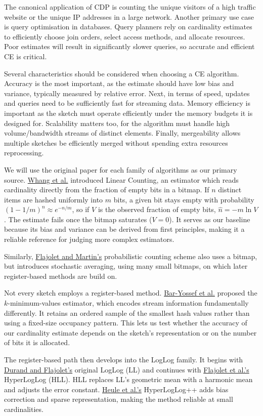 The canonical application of CDP is counting the unique visitors of a high traffic website or the unique IP addresses in a large network. Another primary use case is query optimisation in databases. Query planners rely on cardinality estimates to efficiently choose join orders, select access methods, and allocate resources. Poor estimates will result in significantly slower queries, so accurate and efficient CE is critical.

Several characteristics should be considered when choosing a CE algorithm. Accuracy is the most important, as the estimate should have low bias and variance, typically measured by relative error. Next, in terms of speed, updates and queries need to be sufficiently fast for streaming data. Memory efficiency is important as the sketch must operate efficiently under the memory budgets it is designed for. Scalability matters too, for the algorithm must handle high volume/bandwidth streams of distinct elements. Finally, mergeability allows multiple sketches be efficiently merged without spending extra resources reprocessing.

We will use the original paper for each family of algorithms as our primary source.
\hyperref[whang1990]{Whang et al.} introduced Linear Counting, an estimator which reads cardinality directly from the fraction of empty bits in a bitmap. If $n$ distinct items are hashed uniformly into $m$ bits, a given bit stays empty with probability $(1 - 1 / m)^n\approx e^{-n / m}$, so if $V$ is the observed fraction of empty bits, $\hat{n}= -m \ln V$. The estimate fails once the bitmap saturates ($V=0$). It serves as our baseline because its bias and variance can be derived from first principles, making it a reliable reference for judging more complex estimators.

Similarly, \hyperref[flajolet1985]{Flajolet and Martin's} probabilistic counting scheme also uses a bitmap, but introduces stochastic averaging, using many small bitmaps, on which later register-based methods are build on.

Not every sketch employs a register-based method. \hyperref[baryossef2002]{Bar-Yossef et al.} proposed the $k$-minimum-values estimator, which encodes stream information fundamentally differently. It retains an ordered sample of the smallest hash values rather than using a fixed-size occupancy pattern. This lets us test whether the accuracy of our cardinality estimate depends on the sketch's representation or on the number of bits it is allocated.

The register-based path then develops into the LogLog family. It begins with \hyperref[durand2003]{Durand and Flajolet's} original LogLog (LL) and continues with \hyperref[flajolet2007]{Flajolet et al.'s} HyperLogLog (HLL). HLL replaces LL's geometric mean with a harmonic mean and adjusts the error constant. \hyperref[heule2013]{Heule et al.'s} HyperLogLog++ adds bias correction and sparse representation, making the method reliable at small cardinalities.

